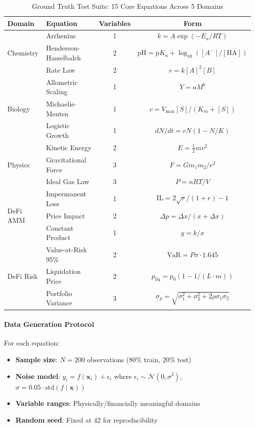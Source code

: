 \documentclass[twoside,11pt]{article}
\begin{document}
\begin{table}[htbp]
\centering
\caption{Ground Truth Test Suite: 15 Core Equations Across 5 Domains}
\label{tab:ground_truth_suite}
\small
\begin{tabular}{llcc}
\toprule
\textbf{Domain} & \textbf{Equation} & \textbf{Variables} & \textbf{Form} \\
\midrule
\multirow{3}{*}{Chemistry} 
& Arrhenius & 1 & $k = A\exp(-E_a/RT)$ \\
& Henderson-Hasselbalch & 2 & $\text{pH} = \text{p}K_a + \log_{10}([A^-]/[\text{HA}])$ \\
& Rate Law & 2 & $r = k[A]^2[B]$ \\
\midrule
\multirow{3}{*}{Biology}
& Allometric Scaling & 1 & $Y = aM^b$ \\
& Michaelis-Menten & 1 & $v = V_{\max}[S]/(K_m + [S])$ \\
& Logistic Growth & 1 & $dN/dt = rN(1-N/K)$ \\
\midrule
\multirow{3}{*}{Physics}
& Kinetic Energy & 2 & $E = \frac{1}{2}mv^2$ \\
& Gravitational Force & 3 & $F = Gm_1m_2/r^2$ \\
& Ideal Gas Law & 3 & $P = nRT/V$ \\
\midrule
\multirow{3}{*}{DeFi AMM}
& Impermanent Loss & 1 & $\text{IL} = 2\sqrt{r}/(1+r) - 1$ \\
& Price Impact & 2 & $\Delta p = \Delta x/(x + \Delta x)$ \\
& Constant Product & 1 & $y = k/x$ \\
\midrule
\multirow{3}{*}{DeFi Risk}
& Value-at-Risk 95\% & 2 & $\text{VaR} = P\sigma \cdot 1.645$ \\
& Liquidation Price & 2 & $p_{\text{liq}} = p_0(1 - 1/(L \cdot m))$ \\
& Portfolio Variance & 3 & $\sigma_p = \sqrt{\sigma_1^2 + \sigma_2^2 + 2\rho\sigma_1\sigma_2}$ \\
\bottomrule
\end{tabular}
\end{table}

\paragraph{Data Generation Protocol}

For each equation:
\begin{itemize}
    \item \textbf{Sample size}: $N = 200$ observations (80\% train, 20\% test)
    \item \textbf{Noise model}: $y_i = f(\mathbf{x}_i) + \epsilon_i$ where $\epsilon_i \sim \mathcal{N}(0, \sigma^2)$, $\sigma = 0.05 \cdot \text{std}(f(\mathbf{x}))$
    \item \textbf{Variable ranges}: Physically/financially meaningful domains
    \item \textbf{Random seed}: Fixed at 42 for reproducibility
\end{itemize}
\end{document}
